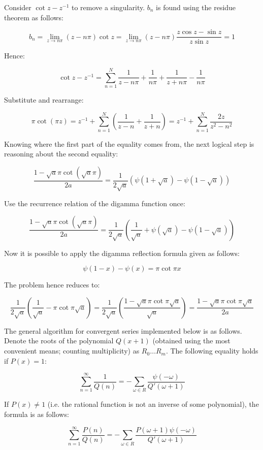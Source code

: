 \noindent Consider $\cot z - z^{-1}$ to remove a singularity. $b_n$ is found using the residue theorem as follows:

$$
b_n = \lim_{z \to n\pi} (z-n\pi)\cot z = \lim_{z \to n\pi} (z-n\pi) \frac{z \cos z - \sin z}{z \sin z} = 1
$$

\noindent Hence:

$$
\cot z - z^{-1} = \sum_{n=1}^N \frac{1}{z-n\pi} + \frac{1}{n\pi} + \frac{1}{z+n\pi} - \frac{1}{n\pi}
$$

\noindent Substitute and rearrange:

$$
\pi \cot(\pi z) = z^{-1} + \sum_{n=1}^N \left(\frac{1}{z-n} + \frac{1}{z+n}\right) = z^{-1} + \sum_{n=1}^N \frac{2z}{z^2-n^2}
$$

\noindent Knowing where the first part of the equality comes from, the next logical step is reasoning about the second equality:

$$
\frac{1-\sqrt{a}\pi\cot(\sqrt{a}\pi)}{2a} = \frac{1}{2\sqrt{a}}\left(\psi\left(1+\sqrt{a}\right)-\psi\left(1-\sqrt{a}\right)\right)
$$

\noindent Use the recurrence relation of the digamma function once:

$$
\frac{1-\sqrt{a}\pi\cot(\sqrt{a}\pi)}{2a} = \frac{1}{2\sqrt{a}}\left(\frac{1}{\sqrt{a}}+\psi\left(\sqrt{a}\right)-\psi\left(1-\sqrt{a}\right)\right)
$$

\noindent Now it is possible to apply the digamma reflection formula given as follows:

$$
\psi (1-x)-\psi (x)=\pi \cot \pi x
$$

\noindent The problem hence reduces to:

$$
\frac{1}{2\sqrt{a}}\left(\frac{1}{\sqrt{a}}-\pi\cot\pi\sqrt{a}\right) = \frac{1}{2\sqrt{a}}\left(\frac{1-\sqrt{a}\pi\cot\pi\sqrt{a}}{\sqrt{a}}\right) = \frac{1-\sqrt{a}\pi\cot\pi\sqrt{a}}{2a}
$$

The general algorithm for convergent series implemented below is as follows. Denote the roots of the polynomial $Q(x+1)$ (obtained using the most convenient means; counting multiplicity) as $R_0 \dots R_m$. The following equality holds if $P(x)=1$:

$$
\sum_{n=1}^\infty \frac{1}{Q(n)} = -\sum_{\omega \in R} \frac{\psi(-\omega)}{Q'(\omega + 1)}
$$

If $P(x) \ne 1$ (i.e. the rational function is not an inverse of some polynomial), the formula is as follows:

$$
\sum_{n=1}^\infty \frac{P(n)}{Q(n)} = -\sum_{\omega \in R} \frac{P(\omega + 1) \psi(-\omega)}{Q'(\omega + 1)}
$$

